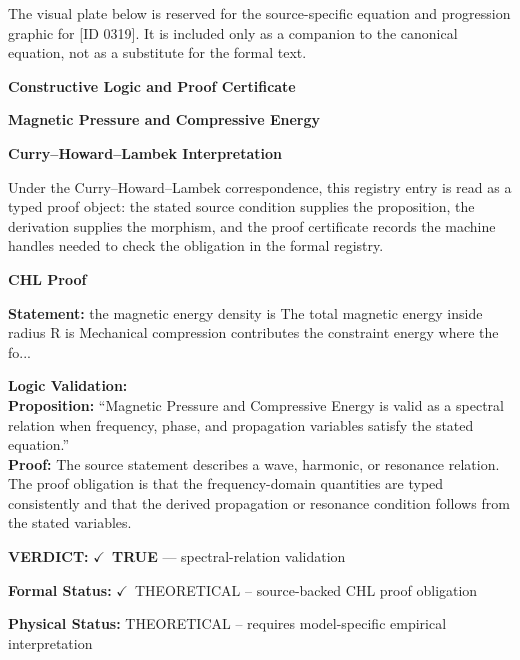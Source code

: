 \begingroup\footnotesize\sloppy
The visual plate below is reserved for the source-specific equation and progression graphic for [ID 0319]. It is included only as a companion to the canonical equation, not as a substitute for the formal text.
\par\endgroup
\ifTZPDarkEdition
{}
\fi

\clearpage
\begingroup\tzpsupportsetup
\noindent\textbf{\fontsize{10.8pt}{12.8pt}\selectfont [ID 0319] Constructive Logic and Proof Certificate}\par
\noindent\textbf{\fontsize{10pt}{12pt}\selectfont Magnetic Pressure and Compressive Energy}\par
\vspace{0.45em}
\begingroup
\footnotesize
\setlength{\parskip}{0.22em}
\setlength{\parindent}{0pt}
\noindent\textbf{Curry--Howard--Lambek Interpretation}\par
Under the Curry--Howard--Lambek correspondence, this registry entry is read as a typed proof
object: the stated source condition supplies the proposition, the derivation supplies the
morphism, and the proof certificate records the machine handles needed to check the obligation
in the formal registry.

\vspace{0.45em}
\noindent\textbf{CHL Proof}\par
\textbf{Statement:} the magnetic energy density is The total magnetic energy inside radius R is Mechanical
compression contributes the constraint energy where the fo...

\textbf{Logic Validation:}\\
\textbf{Proposition:} ``Magnetic Pressure and Compressive Energy is valid as a spectral relation when frequency,
phase, and propagation variables satisfy the stated equation.''\\
\textbf{Proof:} The source statement describes a wave, harmonic, or resonance relation. The proof
obligation is that the frequency-domain quantities are typed consistently and that the
derived propagation or resonance condition follows from the stated variables.

\textbf{VERDICT:} \ensuremath{\checkmark}\ \textbf{TRUE} --- spectral-relation validation

\textbf{Formal Status:} \ensuremath{\checkmark}\ THEORETICAL -- source-backed CHL proof obligation

\textbf{Physical Status:} THEORETICAL -- requires model-specific empirical interpretation
\par\vspace{0.45em}
\par
\ifTZPDarkEdition
{}
\fi
\endgroup
\endgroup
